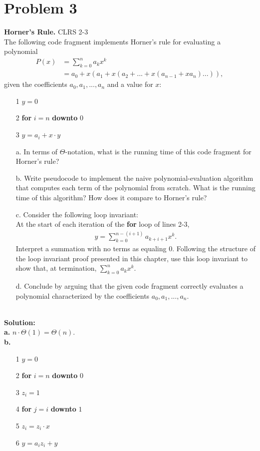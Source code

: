 \documentclass{article}
\theoremstyle{plain}
\begin{document}
\section*{Problem 3}
\textbf{Horner's Rule.} CLRS 2-3\\
The following code fragment implements Horner's rule for evaluating a polynomial 
\begin{align*}
P(x)& = \sum_{k=0}^{n}a_kx^k \\
& = a_0 + x(a_1 + x(a_2 + ... + x(a_{n - 1} + xa_n)...)),
\end{align*}
given the coefficients $a_0, a_1,..., a_n$ and a value for $x:$
\begin{enumerate}
    \item[1] $y = 0$
    \item[2] \textbf{for} $i = n$ \textbf{downto} $0$
    \item[3] \quad \quad $y = a_i + x \cdot y$
\end{enumerate}
\begin{enumerate}
    \item[a.] In terms of $\Theta$-notation, what is the running time of this code fragment for Horner's rule?
    \item[b.] Write pseudocode to implement the naive polynomial-evaluation algorithm that computes each term of the polynomial from scratch. What is the running time of this algorithm? How does it compare to Horner's rule?
    \item[c.] Consider the following loop invariant:\\At the start of each iteration of the \textbf{for} loop of lines 2-3,
    \begin{align*}
        y = \sum_{k=0}^{n-(i+1)}a_{k+i+1}x^k.
    \end{align*}
    Interpret a summation with no terms as equaling 0. Following the structure of the loop invariant proof presented in this chapter, use this loop invariant to show that, at termination, ${\textstyle \sum_{k=0}^{n}}a_kx^k $.
    \item[d.] Conclude by arguing that the given code fragment correctly evaluates a polynomial characterized by the coefficients $a_0, a_1,..., a_n$.
\end{enumerate}
\textbf{\\Solution:\\}
\textbf{a.} $n \cdot \Theta(1) = \Theta(n)$.\\
\textbf{b.\\} 
\begin{enumerate}
    \item[1] $y = 0$
    \item[2] \textbf{for} $i = n$ \textbf{downto} $0$
    \item[3] \quad \quad $z_i = 1$
    \item[4] \quad \quad \textbf{for} $j = i$ \textbf{downto} $1$
    \item[5] \quad \quad \quad \quad $z_i = z_i \cdot x$
    \item[6] \quad \quad $y = a_i z_i + y$
\end{enumerate}
\end{document}
